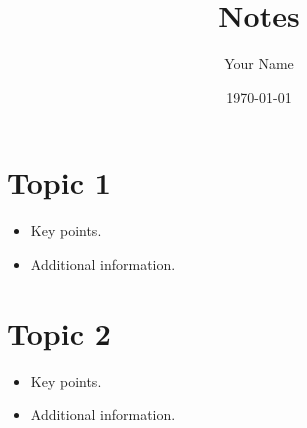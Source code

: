 \documentclass[a4paper,12pt]{article}
\title{Notes}
\author{Your Name}
\date{\today}
\begin{document}
\maketitle

\section{Topic 1}
\begin{itemize}
    \item Key points.
    \item Additional information.
\end{itemize}

\section{Topic 2}
\begin{itemize}
    \item Key points.
    \item Additional information.
\end{itemize}
\end{document}
